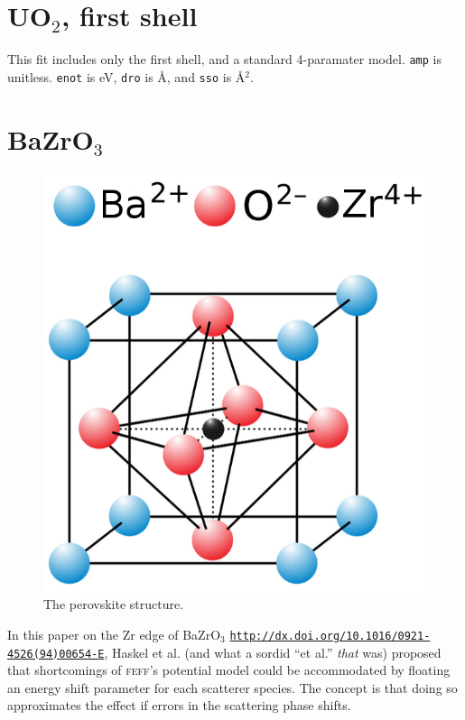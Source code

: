 \documentclass{article}
\let\stdsection\section
\renewcommand\section{\newpage\stdsection}
\begin{document}
\scriptsize

\fitplots


\section{UO$_2$, first shell}

\normalsize
This fit includes only the first shell, and a standard 4-paramater
model.  \texttt{amp} is unitless.  \texttt{enot} is eV, \texttt{dro}
is \AA, and \texttt{sso} is \AA$^2$.

\def\fefffirst{_1st}

\small

\fitplots





\section{BaZrO$_3$}
\normalsize


\begin{figure}
  \includegraphics[width=\linewidth]{BaZrO3/perovskite.png}
  \caption{The perovskite structure.}
\end{figure}
In this paper on the Zr edge of BaZrO$_3$
\href{http://dx.doi.org/10.1016/0921-4526(94)00654-E}
{\texttt{http://dx.doi.org/10.1016/0921-4526(94)00654-E}}, Haskel et
al. (and what a sordid ``et al.'' \textit{that} was) proposed that
shortcomings of \textsc{feff}'s potential model could be accommodated
by floating an energy shift parameter for each scatterer species.  The
concept is that doing so approximates the effect if errors in the
scattering phase shifts.
\end{document}
